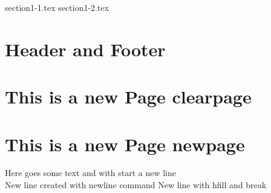     {section1-1.tex}
    {section1-2.tex}

    \section{Header and Footer}

    \renewcommand{\headrulewidth}{0.25mm}
    \renewcommand{\footrulewidth}{0.15mm}
    \renewcommand{\headruleskip}{5pt}
    \renewcommand{\footruleskip}{5pt}


    \pagestyle{fancy}   %
    \fancyhead{}    %
    \fancyhead[R]{\thepage} %
    \fancyfoot{}    %
    \blindtext[10]

    \clearpage  %
    \section{This is a new Page clearpage}
    \newpage    %
    \section{This is a new Page newpage}
    Here goes some text and with start a new line \\
    New line created with newline command \newline
    New line with hfill and break \hfill \break

